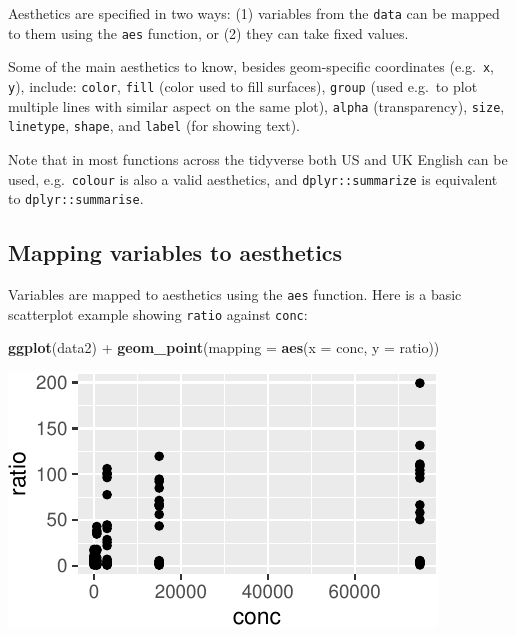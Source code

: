 \documentclass[]{book}
\newenvironment{Shaded}{}{}
\newcommand{\DataTypeTok}[1]{\textcolor[rgb]{0.56,0.13,0.00}{#1}}
\newcommand{\KeywordTok}[1]{\textcolor[rgb]{0.00,0.44,0.13}{\textbf{#1}}}
\newcommand{\NormalTok}[1]{#1}
\newcommand{\OperatorTok}[1]{\textcolor[rgb]{0.40,0.40,0.40}{#1}}
\newcommand{\StringTok}[1]{\textcolor[rgb]{0.25,0.44,0.63}{#1}}
\begin{document}
Aesthetics are specified in two ways: (1) variables from the \texttt{data} can be mapped to them using the \texttt{aes} function, or (2) they can take fixed values.

Some of the main aesthetics to know, besides geom-specific coordinates (e.g.~\texttt{x}, \texttt{y}), include: \texttt{color}, \texttt{fill} (color used to fill surfaces), \texttt{group} (used e.g.~to plot multiple lines with similar aspect on the same plot), \texttt{alpha} (transparency), \texttt{size}, \texttt{linetype}, \texttt{shape}, and \texttt{label} (for showing text).

Note that in most functions across the tidyverse both US and UK English can be used, e.g.~\texttt{colour} is also a valid aesthetics, and \texttt{dplyr::summarize} is equivalent to \texttt{dplyr::summarise}.

\hypertarget{mapping-variables-to-aesthetics}{%
\subsection{Mapping variables to aesthetics}\label{mapping-variables-to-aesthetics}}

Variables are mapped to aesthetics using the \texttt{aes} function. Here is a basic scatterplot example showing \texttt{ratio} against \texttt{conc}:

\begin{Shaded}
\begin{Highlighting}[]
\KeywordTok{ggplot}\NormalTok{(data2) }\OperatorTok{+}
\StringTok{  }\KeywordTok{geom_point}\NormalTok{(}\DataTypeTok{mapping =} \KeywordTok{aes}\NormalTok{(}\DataTypeTok{x =}\NormalTok{ conc, }\DataTypeTok{y =}\NormalTok{ ratio))}
\end{Highlighting}
\end{Shaded}

\begin{center}\includegraphics[width=\textwidth]{TRES-Tidy-Tutorial_files/figure-latex/unnamed-chunk-109-1} \end{center}
\end{document}
